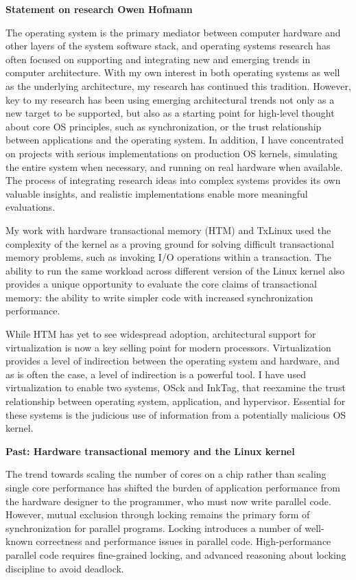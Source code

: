 \documentclass{article}
\newcommand{\osck}{OSck\xspace}
\newcommand{\inktag}{InkTag\xspace}
\begin{document}
{\noindent \bf Statement on research \hfill Owen Hofmann}

\bigskip

The operating system is the primary mediator between computer hardware and
other layers of the system software stack, and operating systems research
has often focused on supporting and integrating new and emerging trends in
computer architecture. With my own interest in both operating systems as
well as the underlying architecture, my research has continued this
tradition.  However, key to my research has been using emerging
architectural trends not only as a new target to be supported, but also as
a starting point for high-level thought about core OS principles, such as
synchronization, or the trust relationship
between applications and the operating system. In addition, I have
concentrated on projects with serious implementations on production OS
kernels, simulating the entire system when necessary, and running on real
hardware when available. The process of integrating research ideas into
complex systems provides its own valuable insights, and realistic
implementations enable more meaningful evaluations.

My work with hardware transactional memory (HTM) and TxLinux
used the complexity of the kernel as a proving ground for solving difficult
transactional memory problems, such as invoking I/O operations within a
transaction. The ability to run the same workload across different version
of the Linux kernel also provides a unique opportunity to evaluate the core
claims of transactional memory: the ability to write simpler code with
increased synchronization performance.

While HTM has yet to see widespread adoption, architectural support for
virtualization is now a key selling point for modern processors.
Virtualization provides a level of indirection between the operating
system and hardware, and as is often the case, a level
of indirection is a powerful tool. I have used virtualization to enable two
systems, \osck and \inktag, that reexamine the trust relationship between
operating system, application, and hypervisor. Essential for these systems
is the judicious use of information from a potentially malicious OS kernel.

{\bigskip \noindent\bf Past: Hardware transactional memory and the Linux
kernel}

\noindent
The trend towards scaling the number of cores on a chip rather than scaling
single core performance has shifted the burden of application performance
from the hardware designer to the programmer, who must now write parallel
code.
However, mutual exclusion through locking remains the primary form of
synchronization for parallel programs. Locking introduces a number of
well-known correctness and performance issues in parallel code.
High-performance parallel code requires fine-grained locking, and advanced
reasoning about locking discipline to avoid deadlock.
\end{document}
